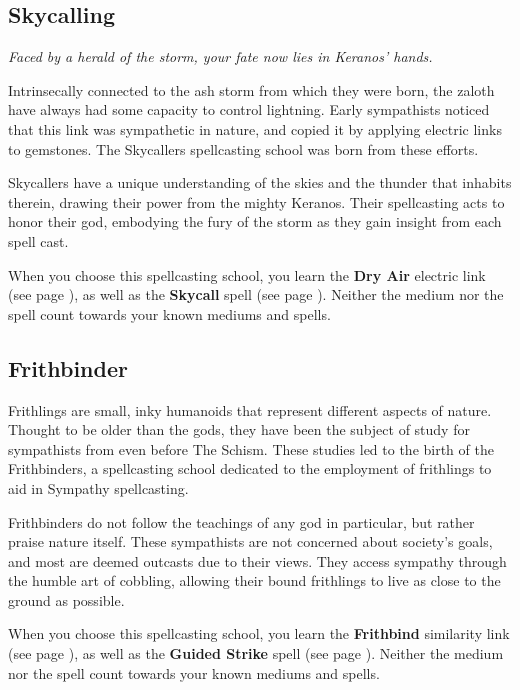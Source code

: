 \subsection*{Skycalling} \label{ssec::skycalling}
    \textit{Faced by a herald of the storm, your fate now lies in Keranos' hands.}

    Intrinsecally connected to the ash storm from which they were born, the zaloth have always had some capacity to control lightning.
    Early sympathists noticed that this link was sympathetic in nature, and copied it by applying electric links to gemstones.
    The Skycallers spellcasting school was born from these efforts.

    Skycallers have a unique understanding of the skies and the thunder that inhabits therein, drawing their power from the mighty Keranos.
    Their spellcasting acts to honor their god, embodying the fury of the storm as they gain insight from each spell cast.

    When you choose this spellcasting school, you learn the \textbf{Dry Air} electric link (see page \pageref{medium::dryair}), as well as the \textbf{Skycall} spell (see page \pageref{spell::skycall}).
    Neither the medium nor the spell count towards your known mediums and spells.

\subsection*{Frithbinder} \label{ssec::frithbinder}
    \textit{}

    Frithlings are small, inky humanoids that represent different aspects of nature.
    Thought to be older than the gods, they have been the subject of study for sympathists from even before The Schism.
    These studies led to the birth of the Frithbinders, a spellcasting school dedicated to the employment of frithlings to aid in Sympathy spellcasting.

    Frithbinders do not follow the teachings of any god in particular, but rather praise nature itself.
    These sympathists are not concerned about society's goals, and most are deemed outcasts due to their views.
    They access sympathy through the humble art of cobbling, allowing their bound frithlings to live as close to the ground as possible.

    When you choose this spellcasting school, you learn the \textbf{Frithbind} similarity link (see page \pageref{medium::frithbind}), as well as the \textbf{Guided Strike} spell (see page \pageref{spell::guidedstrike}).
    Neither the medium nor the spell count towards your known mediums and spells.

\newpage
